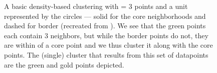 \begin{figure}
\captionsetup[subfigure]{width=\textwidth}
\centering
    
    \vspace{12pt}
\caption{A basic density-based clustering with \minneigh{} = 3 points and a unit \eps{} represented by the circles --- solid for the core neighborhoods and dashed for border (recreated from \cite{johnson2015density}).
We see that the green points each contain 3 neighbors, but while the border points do not, they are within \eps{} of a core point and we thus cluster it along with the core points.
The (single) cluster that results from this set of datapoints are the green and gold points depicted.
}
\label{fig:density-based-clustering}
\end{figure}